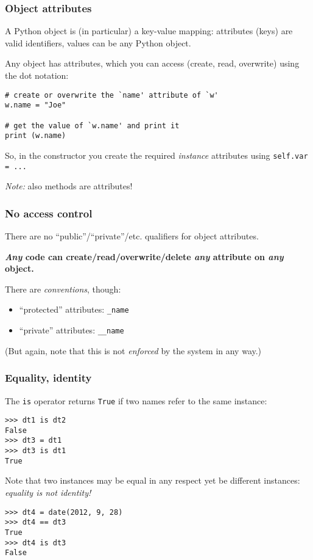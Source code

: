 \documentclass[english,serif,mathserif,xcolor=pdftex,dvipsnames,table]{beamer}
\begin{document}
\begin{frame}[fragile]
  \frametitle{Object attributes}

  A Python object is (in particular) a key-value mapping: attributes
  (keys) are valid identifiers, values can be any Python object.

  \+
  Any object has attributes, which you can access (create, read,
  overwrite) using the dot notation:
\begin{lstlisting}
# create or overwrite the `name' attribute of `w'
w.name = "Joe"

# get the value of `w.name' and print it
print (w.name)
\end{lstlisting}

  \+ 
  So, in the constructor you create the required \emph{instance}
  attributes using \lstinline|self.var = ...|

  \+
  \emph{Note:} also methods are attributes!
\end{frame}


\begin{frame}
  \frametitle{No access control}
  There are no ``public''/``private''/etc. qualifiers for object
  attributes.

  \+
  \textbf{\emph{Any} code can create/read/overwrite/delete \emph{any} attribute on
    \emph{any} object.}

  \+
  There are \emph{conventions}, though:
  \begin{itemize}
  \item ``protected'' attributes: \texttt{\_name}
  \item ``private'' attributes: \texttt{\_\_name}
  \end{itemize}
  (But again, note that this is not \emph{enforced} by the system in
  any way.)

\end{frame}


\begin{frame}
  \frametitle{Equality, identity}
  The \texttt{is} operator returns \texttt{True} if two names refer to
  the same instance:
\begin{lstlisting}
>>> dt1 is dt2
False
>>> dt3 = dt1
>>> dt3 is dt1
True
\end{lstlisting}

  \+ 
  Note that two instances may be equal in any respect yet be
  different instances: \emph{equality is not identity!}
\begin{lstlisting}
>>> dt4 = date(2012, 9, 28)
>>> dt4 == dt3
True
>>> dt4 is dt3
False
\end{lstlisting}
\end{frame}
\end{document}
